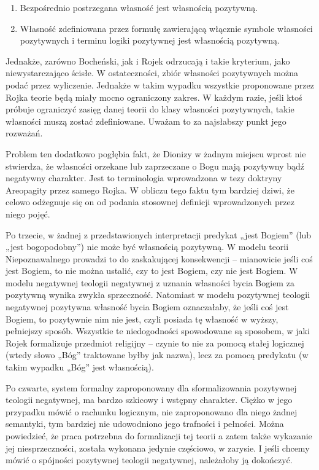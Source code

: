 \begin{enumerate}
\item Bezpośrednio postrzegana własność jest własnością pozytywną.
\item Własność zdefiniowana przez formułę zawierającą włącznie symbole
własności pozytywnych i terminu logiki pozytywnej jest własnością
pozytywną.
\end{enumerate}
Jednakże, zarówno Bocheński, jak i Rojek odrzucają i takie kryterium,
jako niewystarczająco ścisłe. W ostateczności, zbiór własności
pozytywnych można podać przez wyliczenie. Jednakże w takim wypadku
wszystkie proponowane przez Rojka teorie będą miały mocno ograniczony
zakres. W każdym razie, jeśli ktoś próbuje ograniczyć zasięg danej
teorii do klasy własności pozytywnych, takie własności muszą zostać
zdefiniowane. Uważam to za najsłabszy punkt jego rozważań.

Problem ten dodatkowo pogłębia fakt, że Dionizy w żadnym miejscu wprost
nie stwierdza, że własności orzekane lub zaprzeczane o Bogu mają
pozytywny bądź negatywny charakter. Jest to terminologia wprowadzona w
tezy doktryny Areopagity przez samego Rojka. W obliczu tego faktu tym
bardziej dziwi, że celowo odżegnuje się on od podania stosownej
definicji wprowadzonych przez niego pojęć.

Po trzecie, w żadnej z przedstawionych interpretacji predykat „jest
Bogiem” (lub „jest bogopodobny”) nie może być własnością pozytywną. W
modelu teorii Niepoznawalnego prowadzi to do zaskakującej konsekwencji
– mianowicie jeśli coś jest Bogiem, to nie można ustalić, czy to jest
Bogiem, czy nie jest Bogiem. W modelu negatywnej teologii negatywnej z
uznania własności bycia Bogiem za pozytywną wynika zwykła sprzeczność.
Natomiast w modelu pozytywnej teologii negatywnej pozytywna własność
bycia Bogiem oznaczałaby, że jeśli coś jest Bogiem, to pozytywnie nim
nie jest, czyli posiada tę własność w wyższy, pełniejszy sposób.
Wszystkie te niedogodności spowodowane są sposobem, w jaki Rojek
formalizuje przedmiot religijny -- czynie to nie za pomocą stałej
logicznej (wtedy słowo „Bóg” traktowane byłby jak nazwa), lecz za
pomocą predykatu (w takim wypadku „Bóg” jest własnością).

Po czwarte, system formalny zaproponowany dla sformalizowania pozytywnej
teologii negatywnej, ma bardzo szkicowy i wstępny charakter. Ciężko w
jego przypadku mówić o rachunku logicznym, nie zaproponowano dla niego
żadnej semantyki, tym bardziej nie udowodniono jego trafności i
pełności. Można powiedzieć, że praca potrzebna do formalizacji tej
teorii a zatem także wykazanie jej niesprzeczności, została wykonana
jedynie częściowo, w zarysie. I jeśli chcemy mówić o spójności
pozytywnej teologii negatywnej, należałoby ją dokończyć.

